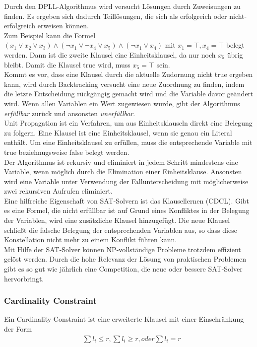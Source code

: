 \documentclass[a4,abstract=on]{scrartcl}
\begin{document}
Durch den DPLL-Algorithmus wird versucht Lösungen durch Zuweisungen zu finden. Es ergeben sich dadurch Teillösungen, die sich als erfolgreich oder nicht-erfolgreich erweisen können. \\
Zum Beispiel kann die Formel $(x_1 \vee x_2 \vee x_3) \wedge (\neg x_1 \vee \neg x_4 \vee x_5) \wedge (\neg x_1 \vee x_4)$ mit $x_1=\top, x_4=\top$ belegt werden. Dann ist die zweite Klausel eine Einheitsklausel, da nur noch $x_5$ übrig bleibt. Damit die Klausel true wird, muss $x_5 = \top$ sein. \\
Kommt es vor, dass eine Klausel durch die aktuelle Zudornung nicht true ergeben kann, wird durch Backtracking versucht eine neue Zuordnung zu finden, indem die letzte Entscheidung rückgängig gemacht wird und die Variable davor geändert wird. 
Wenn allen Variablen ein Wert zugewiesen wurde, gibt der Algorithmus \emph{erfüllbar} zurück und ansonsten \emph{unerfüllbar}.\\
Unit Propagation ist ein Verfahren, um aus Einheitsklauseln direkt eine Belegung zu folgern. Eine Klausel ist eine Einheitsklausel, wenn sie genau ein Literal enthält. Um eine Einheitsklausel zu erfüllen, muss die entsprechende Variable mit true beziehnugsweise false belegt werden.\\
Der Algorithmus ist rekursiv und eliminiert in jedem Schritt mindestens eine Variable, wenn möglich durch die Elimination einer Einheitsklause. Ansonsten wird eine Variable unter Verwendung der Fallunterscheidung mit möglicherweise zwei rekursiven Aufrufen eliminiert.\\
Eine hilfreiche Eigenschaft von SAT-Solvern ist das Klausellernen (CDCL). Gibt es eine Formel, die nicht erfüllbar ist auf Grund eines Konfliktes in der Belegung der Variablen, wird eine zusätzliche Klausel hinzugefügt. Die neue Klausel schließt die falsche Belegung der entsprechenden Variablen aus, so dass diese Konstellation nicht mehr zu einem Konflikt führen kann.\\
Mit Hilfe der SAT-Solver können NP-vollständige Probleme trotzdem effizient gelöst werden. Durch die hohe Relevanz der Lösung von praktischen Problemen gibt es so gut wie jährlich eine Competition, die neue oder bessere SAT-Solver hervorbringt.

\subsubsection{Cardinality Constraint}
Ein Cardinality Constraint ist eine erweiterte Klausel mit einer Einschränkung der Form 
\begin{align*}
&\sum l_i \leq r, \sum l_i \geq r, oder \sum l_i = r
\end{align*}
\end{document}
